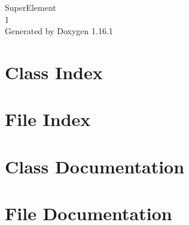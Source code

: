 \documentclass[twoside]{book}
\newcommand{\+}{\discretionary{\mbox{\scriptsize$\hookleftarrow$}}{}{}}
\newcommand{\clearemptydoublepage}{%
    \newpage{\pagestyle{empty}\cleardoublepage}%
  }
\begin{document}
  \raggedbottom
    \hypersetup{pageanchor=false,
                bookmarksnumbered=true,
                pdfencoding=unicode
               }
  \begin{titlepage}
  \vspace*{7cm}
  \begin{center}%
  {\Large Super\+Element}\\
  [1ex]\large 1 \\
  \vspace*{1cm}
  {\large Generated by Doxygen 1.16.1}\\
  \end{center}
  \end{titlepage}
  \clearemptydoublepage
  \tableofcontents
  \clearemptydoublepage
  \hypersetup{pageanchor=true}
\chapter{Class Index}

\chapter{File Index}

\chapter{Class Documentation}




\chapter{File Documentation}






  \backmatter
  \newpage
  \clearemptydoublepage
  \printindex
\end{document}
